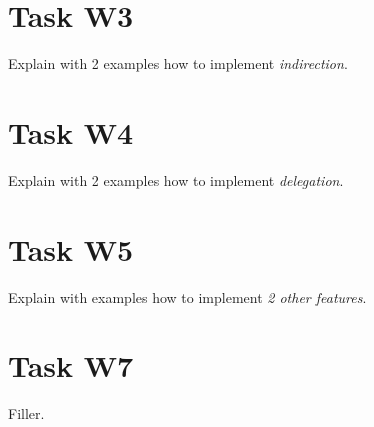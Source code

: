 \documentclass{article}
\providecommand{\task}[1]{\section{Task #1}}
\begin{document}
\task{W3}
Explain with 2 examples how to implement \textit{indirection}.

\task{W4}
Explain with 2 examples how to implement \textit{delegation}.


\task{W5}
Explain with examples how to implement \textit{2 other features}.


\section{Task W7}
Filler.

\pagebreak

\printbibliography[heading=bibintoc]
\end{document}
